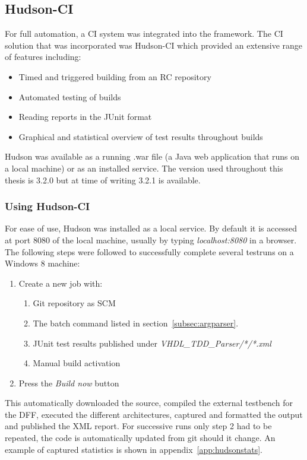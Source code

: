 \documentclass[11pt,british]{article}
\begin{document}
\subsection{Hudson-CI}
\label{subsec:Hudson}
For full automation, a \gls{CI} system was integrated into the framework. The \gls{CI} solution that was incorporated was Hudson-CI which provided an extensive range of features including:
\begin{itemize}%
\item Timed and triggered building from an \gls{RC} repository
\item Automated testing of builds
\item Reading reports in the JUnit format
\item Graphical and statistical overview of test results throughout builds
\end{itemize}
Hudson was available as a running .war file (a Java web application that runs on a local machine) or as an installed service.\cite{hudson} The version used throughout this thesis is 3.2.0 but at time of writing 3.2.1 is available.

\subsubsection{Using Hudson-CI}
For ease of use, Hudson was installed as a local service. By default it is accessed at port 8080 of the local machine, usually by typing \emph{localhost:8080} in a browser. The following steps were followed to successfully complete several testruns on a Windows 8 machine:
\begin{enumerate}
\item Create a new job with:
\begin{enumerate}
\item Git repository as SCM
\item The batch command listed in section~\ref{subsec:argparser}.
\item JUnit test results published under \emph{VHDL\_TDD\_Parser/*/*.xml}
\item Manual build activation
\end{enumerate}
\item Press the \emph{Build now} button
\end{enumerate}
This automatically downloaded the source, compiled the external testbench for the \gls{DFF}, executed the different architectures, captured and formatted the output and published the \gls{XML} report. For successive runs only step 2 had to be repeated, the code is automatically updated from git should it change. An example of captured statistics is shown in appendix~\ref{app:hudsonstats}.
\end{document}

